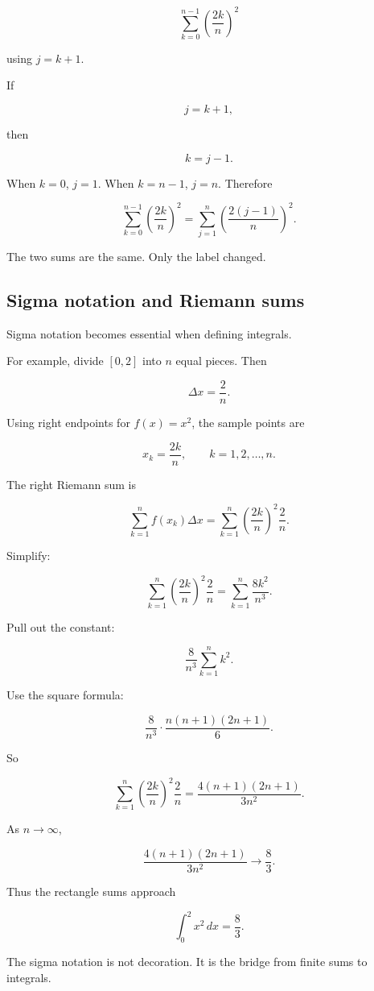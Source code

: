 \[
\sum_{k=0}^{n-1} \left(\frac{2k}{n}\right)^2
\]

using \(j=k+1\).

If

\[
j=k+1,
\]

then

\[
k=j-1.
\]

When \(k=0\), \(j=1\).  When \(k=n-1\), \(j=n\).  Therefore

\[
\sum_{k=0}^{n-1} \left(\frac{2k}{n}\right)^2
=
\sum_{j=1}^{n} \left(\frac{2(j-1)}{n}\right)^2.
\]

The two sums are the same.  Only the label changed.

\subsection{Sigma notation and Riemann sums}
\label{appsubsec:sigma-riemann-sums}

Sigma notation becomes essential when defining integrals.

For example, divide \([0,2]\) into \(n\) equal pieces.  Then

\[
\Delta x=\frac{2}{n}.
\]

Using right endpoints for \(f(x)=x^2\), the sample points are

\[
x_k=\frac{2k}{n},
\qquad k=1,2,\ldots,n.
\]

The right Riemann sum is

\[
\sum_{k=1}^{n} f(x_k)\Delta x
=
\sum_{k=1}^{n}
\left(\frac{2k}{n}\right)^2\frac{2}{n}.
\]

Simplify:

\[
\sum_{k=1}^{n}
\left(\frac{2k}{n}\right)^2\frac{2}{n}
=
\sum_{k=1}^{n}
\frac{8k^2}{n^3}.
\]

Pull out the constant:

\[
\frac{8}{n^3}\sum_{k=1}^{n}k^2.
\]

Use the square formula:

\[
\frac{8}{n^3}\cdot\frac{n(n+1)(2n+1)}6.
\]

So

\[
\boxed{
\sum_{k=1}^{n}
\left(\frac{2k}{n}\right)^2\frac{2}{n}
=
\frac{4(n+1)(2n+1)}{3n^2}.
}
\]

As \(n\to\infty\),

\[
\frac{4(n+1)(2n+1)}{3n^2}
\to
\frac{8}{3}.
\]

Thus the rectangle sums approach

\[
\int_0^2 x^2\,dx=\frac83.
\]

The sigma notation is not decoration.  It is the bridge from finite sums to integrals.

